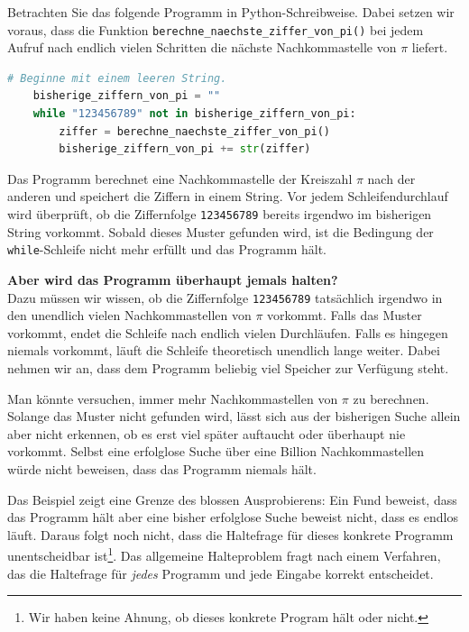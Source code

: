 \begin{myexample}\label{myexample:pi_halt}
	Betrachten Sie das folgende Programm in Python-Schreibweise. Dabei setzen wir voraus, dass die Funktion \lstinline{berechne_naechste_ziffer_von_pi()} bei jedem Aufruf nach endlich vielen Schritten die nächste Nachkommastelle von $\pi$ liefert.
    \begin{lstlisting}[language=Python, numbers=none]
    # Beginne mit einem leeren String.
    bisherige_ziffern_von_pi = ""
    while "123456789" not in bisherige_ziffern_von_pi:
        ziffer = berechne_naechste_ziffer_von_pi()
        bisherige_ziffern_von_pi += str(ziffer)
    \end{lstlisting}
	Das Programm berechnet eine Nachkommastelle der Kreiszahl $\pi$ nach der anderen und speichert die Ziffern in einem String. Vor jedem Schleifendurchlauf wird überprüft, ob die Ziffernfolge \lstinline{123456789} bereits irgendwo im bisherigen String vorkommt. Sobald dieses Muster gefunden wird, ist die Bedingung der \lstinline{while}-Schleife nicht mehr erfüllt und das Programm hält.

	\textbf{Aber wird das Programm überhaupt jemals halten?}\\
    Dazu müssen wir wissen, ob die Ziffernfolge \lstinline{123456789} tatsächlich irgendwo in den unendlich vielen Nachkommastellen von $\pi$ vorkommt. Falls das Muster vorkommt, endet die Schleife nach endlich vielen Durchläufen. Falls es hingegen niemals vorkommt, läuft die Schleife theoretisch unendlich lange weiter. Dabei nehmen wir an, dass dem Programm beliebig viel Speicher zur Verfügung steht.

	Man könnte versuchen, immer mehr Nachkommastellen von $\pi$ zu berechnen. Solange das Muster nicht gefunden wird, lässt sich aus der bisherigen Suche allein aber nicht erkennen, ob es erst viel später auftaucht oder überhaupt nie vorkommt. Selbst eine erfolglose Suche über eine Billion Nachkommastellen würde nicht beweisen, dass das Programm niemals hält.

	Das Beispiel zeigt eine Grenze des blossen Ausprobierens: Ein Fund beweist, dass das Programm hält aber eine bisher erfolglose Suche beweist nicht, dass es endlos läuft. Daraus folgt noch nicht, dass die Haltefrage für dieses konkrete Programm unentscheidbar ist\footnote{Wir haben keine Ahnung, ob dieses konkrete Program hält oder nicht.}. Das allgemeine Halteproblem fragt nach einem Verfahren, das die Haltefrage für \emph{jedes} Programm und jede Eingabe korrekt entscheidet.
\end{myexample}

